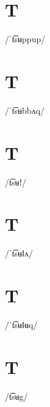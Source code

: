 \documentclass[10pt,a4paper,twoside]{book}
\begin{document}
\section*{T}

\begin{multicols}{3}
 {/ˈt͡sʉppup/} {}
\end{multicols}

\section*{T}

\begin{multicols}{3}
 {/ˈt͡sʉbbʌq/} {}
\end{multicols}

\section*{T}

\begin{multicols}{3}
 {/t͡sʉǃ/} {}
\end{multicols}

\section*{T}

\begin{multicols}{3}
 {/ˈt͡sʉǁʌ/} {}
\end{multicols}

\section*{T}

\begin{multicols}{3}
 {/ˈt͡sʉǁʉq/} {}
\end{multicols}

\section*{T}

\begin{multicols}{3}
 {/t͡sʉg/} {}
\end{multicols}
\end{document}
